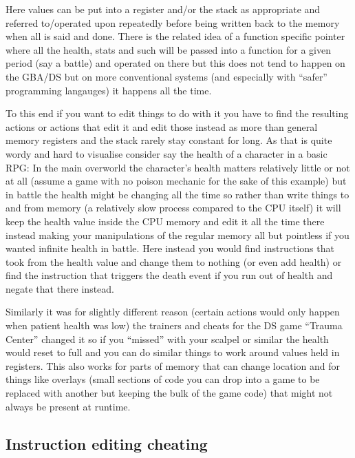 \documentclass[
]{book}
\begin{document}
Here values can be put into a register and/or the stack as appropriate and referred to/operated upon repeatedly before being written back to the memory when all is said and done. There is the related idea of a function specific pointer where all the health, stats and such will be passed into a function for a given period (say a battle) and operated on there but this does not tend to happen on the GBA/DS but on more conventional systems (and especially with ``safer'' programming langauges) it happens all the time.

To this end if you want to edit things to do with it you have to find the resulting actions or actions that edit it and edit those instead as more than general memory registers and the stack rarely stay constant for long. As that is quite wordy and hard to visualise consider say the health of a character in a basic RPG: In the main overworld the character's health matters relatively little or not at all (assume a game with no poison mechanic for the sake of this example) but in battle the health might be changing all the time so rather than write things to and from memory (a relatively slow process compared to the CPU itself) it will keep the health value inside the CPU memory and edit it all the time there instead making your manipulations of the regular memory all but pointless if you wanted infinite health in battle. Here instead you would find instructions that took from the health value and change them to nothing (or even add health) or find the instruction that triggers the death event if you run out of health and negate that there instead.

Similarly it was for slightly different reason (certain actions would only happen when patient health was low) the trainers and cheats for the DS game ``Trauma Center'' changed it so if you ``missed'' with your scalpel or similar the health would reset to full and you can do similar things to work around values held in registers. This also works for parts of memory that can change location and for things like overlays (small sections of code you can drop into a game to be replaced with another but keeping the bulk of the game code) that might not always be present at runtime.

\hypertarget{instruction-editing-cheating}{%
\subsection{Instruction editing cheating}\label{instruction-editing-cheating}}
\end{document}
